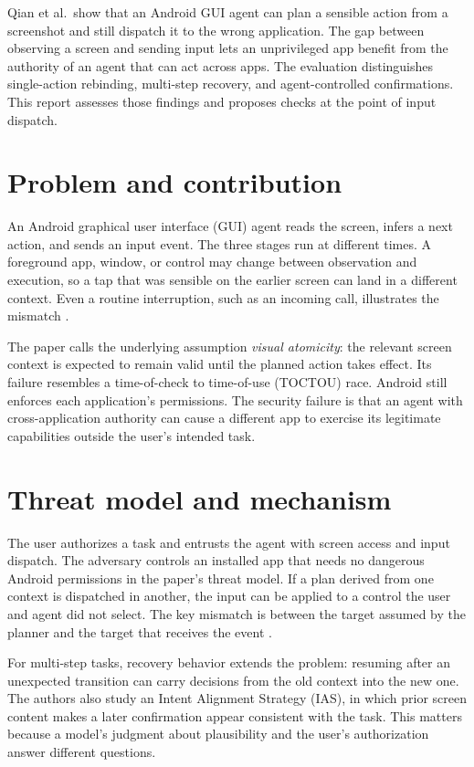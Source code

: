 \documentclass[10pt,a4paper,twoside]{article}
\begin{document}
\makereadingtitle
\begin{readingabstract}
Qian et al.\ show that an Android GUI agent can plan a sensible action from a screenshot and still dispatch it to the wrong application. The gap between observing a screen and sending input lets an unprivileged app benefit from the authority of an agent that can act across apps. The evaluation distinguishes single-action rebinding, multi-step recovery, and agent-controlled confirmations. This report assesses those findings and proposes checks at the point of input dispatch.
\end{readingabstract}

\section{Problem and contribution}
An Android graphical user interface (GUI) agent reads the screen, infers a next action, and sends an input event. The three stages run at different times. A foreground app, window, or control may change between observation and execution, so a tap that was sensible on the earlier screen can land in a different context. Even a routine interruption, such as an incoming call, illustrates the mismatch \citep[Fig.~1 and Sec.~4]{qian2026}.

The paper calls the underlying assumption \emph{visual atomicity}: the relevant screen context is expected to remain valid until the planned action takes effect. Its failure resembles a time-of-check to time-of-use (TOCTOU) race. Android still enforces each application's permissions. The security failure is that an agent with cross-application authority can cause a different app to exercise its legitimate capabilities outside the user's intended task.

\section{Threat model and mechanism}
The user authorizes a task and entrusts the agent with screen access and input dispatch. The adversary controls an installed app that needs no dangerous Android permissions in the paper's threat model. If a plan derived from one context is dispatched in another, the input can be applied to a control the user and agent did not select. The key mismatch is between the target assumed by the planner and the target that receives the event \citep[Secs.~3--6]{qian2026}.

For multi-step tasks, recovery behavior extends the problem: resuming after an unexpected transition can carry decisions from the old context into the new one. The authors also study an Intent Alignment Strategy (IAS), in which prior screen content makes a later confirmation appear consistent with the task. This matters because a model's judgment about plausibility and the user's authorization answer different questions.
\end{document}
